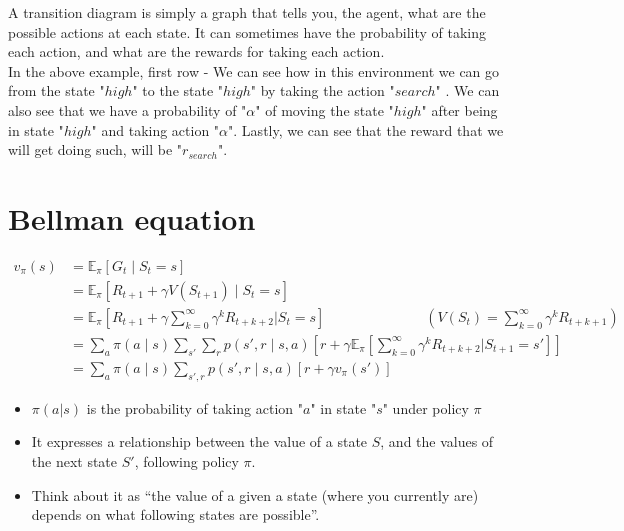 A transition diagram is simply a graph that tells you, the agent, what are the possible actions at each state. It can sometimes have the probability of taking each action, and what are the rewards for taking each action.\\
In the above example, first row - We can see how in this environment we can go from the state "$high$" to the state "$high$" by taking the action "$search$" . We can also see that we have a probability of "$\alpha$" of moving the state "$high$" after being in state "$high$" and taking action "$\alpha$". Lastly, we can see that the reward that we will get doing such, will be "$r_{search}$".


\section{Bellman equation \cite{medium-introduction-to-reinforcement-learning-rl-part-3-finite-markov-decision-processes-51e1f8d3ddb7}}
\begin{align*}
v_\pi(s)  &= \mathbb{E}_\pi [G_t \mid S_t = s] \\ 
    &= \mathbb{E}_\pi [R_{t+1} + \gamma V(S_{t+1}) \mid S_t = s] \\ 
    &= \mathbb{E}_\pi \left[ R_{t+1} + \gamma \sum_{k=0}^{\infty} \gamma^k R_{t+k+2} \bigg| S_t = s \right] \hspace{3cm} \left(V(S_{t}) = \sum_{k=0}^{\infty} \gamma^k R_{t+k+1} \right) \\ 
    &= \sum_a \pi(a \mid s) \sum_{s'} \sum_r p(s', r \mid s, a) \left[ r + \gamma \mathbb{E}_\pi \left[ \sum_{k=0}^{\infty} \gamma^k R_{t+k+2} \bigg| S_{t+1} = s' \right] \right] \\ 
    &= \sum_a \pi(a \mid s) \sum_{s', r} p(s', r \mid s, a) \left[ r + \gamma v_\pi(s') \right] 
\end{align*}

\begin{itemize}
    \item $\pi(a|s)$ is the probability of taking action "$a$" in state "$s$" under policy $\pi$
    \item It expresses a relationship between the value of a state $S$, and the values of the next state $S'$, following policy $\pi$.
    \item Think about it as “the value of a given a state (where you currently are) depends on what following states are possible”.
\end{itemize}

